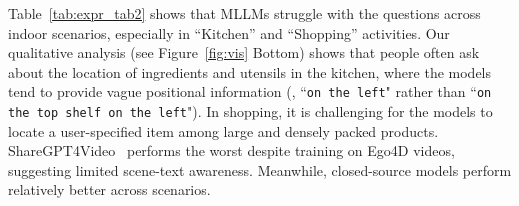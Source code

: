 \noindent\textbf{\datasetin} 
Table~\ref{tab:expr_tab2} shows that MLLMs struggle with the questions across indoor scenarios, especially in “Kitchen” and “Shopping” activities. Our qualitative analysis (see Figure~\ref{fig:vis} Bottom) shows that people often ask about the location of ingredients and utensils in the kitchen, where the models tend to provide vague positional information (\eg, ``\texttt{on the left}" rather than ``\texttt{on the top shelf on the left}"). In shopping, it is challenging for the models to locate a user-specified item among large and densely packed products. ShareGPT4Video~\cite{chen2024sharegpt4video} performs the worst despite training on Ego4D videos, suggesting limited scene-text awareness. Meanwhile, closed-source models perform relatively better across scenarios.


